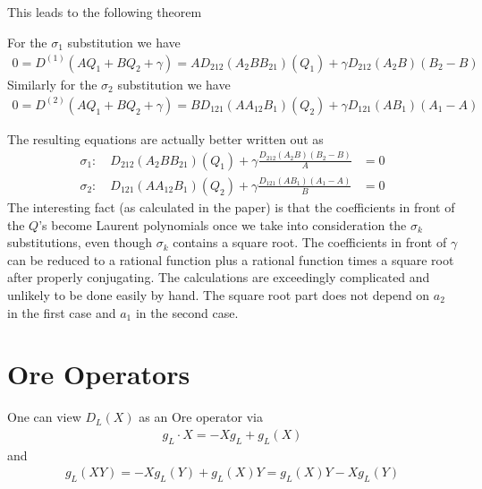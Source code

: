 This leads to the following theorem
\begin{theorem} For the $\sigma_1$ substitution we have
\begin{align}
	0 = D^{(1)}(A Q_1 + B Q_2 + \gamma) = A D_{212}( A_2 B B_{21}) (Q_1)  +\gamma D_{212}(A_2B)(B_2 - B)
\end{align}
Similarly for the $\sigma_2$ substitution we have
\begin{align}
	0 = D^{(2)}(A Q_1 + B Q_2 + \gamma) = B D_{121}( A A_{12} B_1) (Q_2)  +\gamma D_{121}(A B_1)(A_1 - A)
\end{align}
\end{theorem}
The resulting equations are actually better written out as
\begin{align}
	\sigma_1: \quad D_{212}( A_2 B B_{21}) (Q_1)  +\gamma \frac{D_{212}(A_2B)(B_2 - B)}{A} &= 0\\
	\sigma_2: \quad D_{121}( A A_{12} B_1) (Q_2)  +\gamma \frac{D_{121}(A B_1)(A_1 - A)}{B} &=0
\end{align}
The interesting fact (as calculated in the paper) is that the coefficients in front of the $Q$'s become Laurent polynomials once we take into consideration the $\sigma_k$ substitutions, even though $\sigma_k$ contains a square root. The coefficients in front of $\gamma$ can be reduced to a rational function plus a rational function times a square root after properly conjugating. The calculations are exceedingly complicated and unlikely to be done easily by hand. The square root part does not depend on $a_2$ in the first case and $a_1$ in the second case.

\section{Ore Operators}
One can view $D_L(X)$ as an Ore operator via
\begin{align}
	g_L \cdot X = - X g_L + g_L(X)
\end{align}
and
\begin{align}
	g_L(XY) = - X g_L(Y) + g_L(X)Y = g_L(X)Y - X g_L(Y)
\end{align}

\endinput
